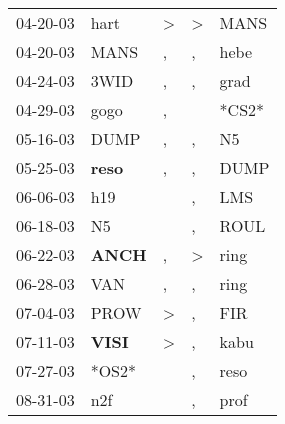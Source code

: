 \begin{supertabular}{p{0.07\textwidth}p{0.06\textwidth}p{0.02\textwidth}p{0.02\textwidth}p{0.06\textwidth}}
          04-20-03\textsuperscript{} &           hart\textsuperscript{} &     \textgreater &     \textgreater &           MANS\textsuperscript{} \\
          04-20-03\textsuperscript{} &           MANS\textsuperscript{} &                , &                , &           hebe\textsuperscript{} \\
          04-24-03\textsuperscript{} &           3WID\textsuperscript{} &                , &                , &           grad\textsuperscript{} \\
          04-29-03\textsuperscript{} &           gogo\textsuperscript{} &                , &                  &                            *CS2* \\
          05-16-03\textsuperscript{} &           DUMP\textsuperscript{} &                , &                , &             N5\textsuperscript{} \\
          05-25-03\textsuperscript{} &  \textbf{reso\textsuperscript{}} &                , &                , &           DUMP\textsuperscript{} \\
          06-06-03\textsuperscript{} &            h19\textsuperscript{} &                  &                , &            LMS\textsuperscript{} \\
          06-18-03\textsuperscript{} &             N5\textsuperscript{} &                  &                , &           ROUL\textsuperscript{} \\
          06-22-03\textsuperscript{} &  \textbf{ANCH\textsuperscript{}} &                , &     \textgreater &           ring\textsuperscript{} \\
          06-28-03\textsuperscript{} &            VAN\textsuperscript{} &                , &                , &           ring\textsuperscript{} \\
          07-04-03\textsuperscript{} &           PROW\textsuperscript{} &     \textgreater &                , &            FIR\textsuperscript{} \\
          07-11-03\textsuperscript{} &  \textbf{VISI\textsuperscript{}} &     \textgreater &                , &           kabu\textsuperscript{} \\
          07-27-03\textsuperscript{} &                            *OS2* &                  &                , &           reso\textsuperscript{} \\
          08-31-03\textsuperscript{} &            n2f\textsuperscript{} &                  &                , &           prof\textsuperscript{} \\

\end{supertabular}
